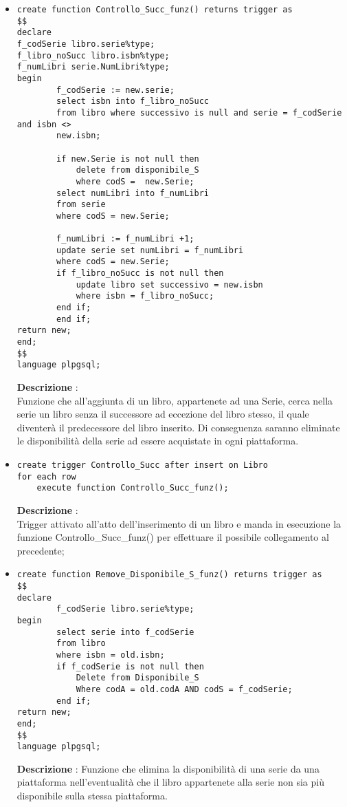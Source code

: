 \begin{itemize}
\item\begin{verbatim}
create function Controllo_Succ_funz() returns trigger as
$$
declare
f_codSerie libro.serie%type;
f_libro_noSucc libro.isbn%type;
f_numLibri serie.NumLibri%type;
begin
        f_codSerie := new.serie;
        select isbn into f_libro_noSucc
        from libro where successivo is null and serie = f_codSerie and isbn <>
        new.isbn;
 	
        if new.Serie is not null then 
            delete from disponibile_S  
            where codS =  new.Serie;    
        select numLibri into f_numLibri    
        from serie
        where codS = new.Serie;

        f_numLibri := f_numLibri +1;
        update serie set numLibri = f_numLibri 
        where codS = new.Serie;
        if f_libro_noSucc is not null then 
            update libro set successivo = new.isbn   
            where isbn = f_libro_noSucc;
        end if;
        end if;
return new;
end;
$$
language plpgsql;
\end{verbatim} 
{\bf Descrizione} : \\
Funzione che all'aggiunta di un libro, appartenete ad una Serie, cerca nella serie un libro senza il successore ad eccezione del libro stesso, il quale  diventerà il predecessore del libro inserito. Di conseguenza saranno eliminate le disponibilità della serie ad essere acquistate in ogni piattaforma.
\item\begin{verbatim}
create trigger Controllo_Succ after insert on Libro 
for each row
    execute function Controllo_Succ_funz();
\end{verbatim}
{\bf Descrizione} :  \\
Trigger  attivato all'atto dell'inserimento di un libro e manda in esecuzione la funzione Controllo\_Succ\_funz() per effettuare il possibile collegamento al precedente;


\item\begin{verbatim}
create function Remove_Disponibile_S_funz() returns trigger as
$$
declare
        f_codSerie libro.serie%type; 	
begin
        select serie into f_codSerie
        from libro 
        where isbn = old.isbn;
        if f_codSerie is not null then 
            Delete from Disponibile_S
            Where codA = old.codA AND codS = f_codSerie;			
        end if;
return new;
end;
$$
language plpgsql;
\end{verbatim}
{\bf Descrizione} : Funzione che elimina la disponibilità di una serie da una piattaforma nell'eventualità che il libro appartenete alla serie non sia più disponibile sulla stessa piattaforma.


\end{itemize}
